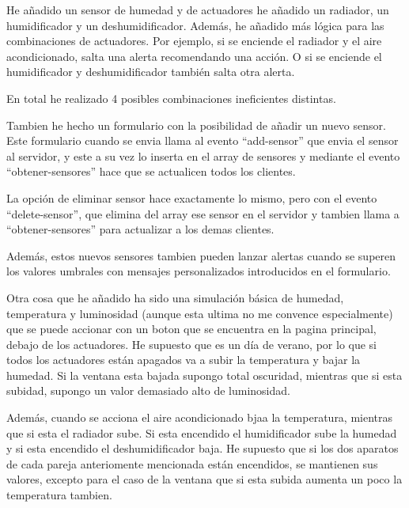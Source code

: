 \documentclass{article}
\begin{document}
He añadido un sensor de humedad y de actuadores he añadido un radiador, un humidificador y un deshumidificador. Además, he añadido más lógica para las combinaciones de actuadores. Por ejemplo, si se enciende el radiador y el aire acondicionado, salta una alerta recomendando una acción. O si se enciende el humidificador y deshumidificador también salta otra alerta.

En total he realizado 4 posibles combinaciones ineficientes distintas.


Tambien he hecho un formulario con la posibilidad de añadir un nuevo sensor. Este formulario cuando se envia llama al evento ``add-sensor'' que envia el sensor al servidor, y este a su vez lo inserta en el array de sensores y mediante el evento ``obtener-sensores'' hace que se actualicen todos los clientes. 


La opción de eliminar sensor hace exactamente lo mismo, pero con el evento ``delete-sensor'', que elimina del array ese sensor en el servidor y tambien llama a ``obtener-sensores'' para actualizar a los demas clientes.



Además, estos nuevos sensores tambien pueden lanzar alertas cuando se superen los valores umbrales con mensajes personalizados introducidos en el formulario.


Otra cosa que he añadido ha sido una simulación básica de humedad, temperatura y luminosidad (aunque esta ultima no me convence especialmente) que se puede accionar con un boton que se encuentra en la pagina principal, debajo de los actuadores. He supuesto que es un día de verano, por lo que si todos los actuadores están apagados va a subir la temperatura y bajar la humedad. Si la ventana esta bajada supongo total oscuridad, mientras que si esta subidad, supongo un valor demasiado alto de luminosidad.

Además, cuando se acciona el aire acondicionado bjaa la temperatura, mientras que si esta el radiador sube. Si esta encendido el humidificador sube la humedad y si esta encendido el deshumidificador baja. He supuesto que si los dos aparatos de cada pareja anteriomente mencionada están encendidos, se mantienen sus valores, excepto para el caso de la ventana que si esta subida aumenta un poco la temperatura tambien.
\end{document}
